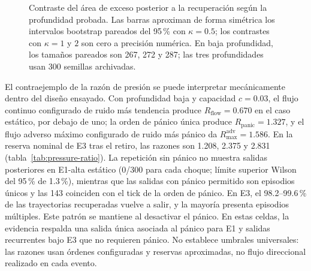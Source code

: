 \begin{figure}[htbp]
\centering
{}
\caption{Contraste del área de exceso posterior a la recuperación según la profundidad probada. Las barras aproximan de forma simétrica los intervalos bootstrap pareados del 95\,\% con $\kappa=0.5$; los contrastes con $\kappa=1$ y $2$ son cero a precisión numérica. En baja profundidad, los tamaños pareados son 267, 272 y 287; las tres profundidades usan 300 semillas archivadas.}
\label{fig:h2-post-recovery}
\end{figure}

El contraejemplo de la razón de presión se puede interpretar mecánicamente dentro del diseño ensayado. Con profundidad baja y capacidad $c=0.03$, el flujo continuo configurado de ruido más tendencia produce $R_{\mathrm{flow}}=0.670$ en el caso estático, por debajo de uno; la orden de pánico única produce $R_{\mathrm{panic}}=1.327$, y el flujo adverso máximo configurado de ruido más pánico da $R_{\max}^{\mathrm{adv}}=1.586$. En la reserva nominal de E3 tras el retiro, las razones son 1.208, 2.375 y 2.831 (tabla~\ref{tab:pressure-ratio}). La repetición sin pánico no muestra salidas posteriores en E1-alta estático (0/300 para cada choque; límite superior Wilson del 95\,\% de 1.3\,\%), mientras que las salidas con pánico permitido son episodios únicos y las 143 coinciden con el tick de la orden de pánico. En E3, el 98.2--99.6\,\% de las trayectorias recuperadas vuelve a salir, y la mayoría presenta episodios múltiples. Este patrón se mantiene al desactivar el pánico. En estas celdas, la evidencia respalda una salida única asociada al pánico para E1 y salidas recurrentes bajo E3 que no requieren pánico. No establece umbrales universales: las razones usan órdenes configuradas y reservas aproximadas, no flujo direccional realizado en cada evento.

